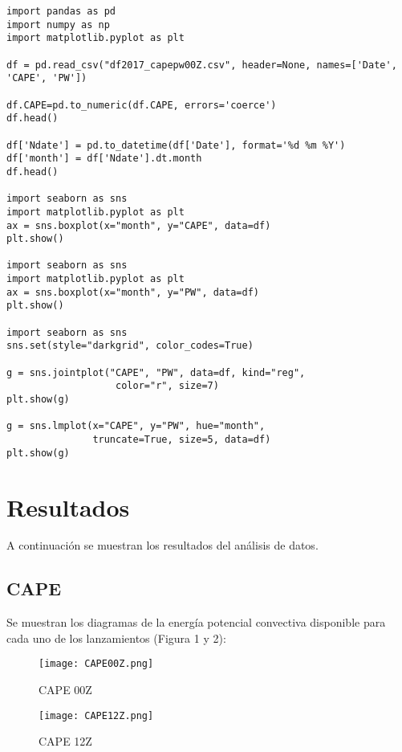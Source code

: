 \documentclass[12pt]{article}
\begin{document}
\begin{verbatim}
import pandas as pd
import numpy as np
import matplotlib.pyplot as plt

df = pd.read_csv("df2017_capepw00Z.csv", header=None, names=['Date', 'CAPE', 'PW'])

df.CAPE=pd.to_numeric(df.CAPE, errors='coerce')
df.head()

df['Ndate'] = pd.to_datetime(df['Date'], format='%d %m %Y')
df['month'] = df['Ndate'].dt.month
df.head()

import seaborn as sns
import matplotlib.pyplot as plt
ax = sns.boxplot(x="month", y="CAPE", data=df)
plt.show()

import seaborn as sns
import matplotlib.pyplot as plt
ax = sns.boxplot(x="month", y="PW", data=df)
plt.show()

import seaborn as sns
sns.set(style="darkgrid", color_codes=True)

g = sns.jointplot("CAPE", "PW", data=df, kind="reg",
                   color="r", size=7)
plt.show(g)

g = sns.lmplot(x="CAPE", y="PW", hue="month",
               truncate=True, size=5, data=df)
plt.show(g)
\end{verbatim}

\pagebreak

\section{Resultados}

A continuación se muestran los resultados del análisis de datos.

\subsection{CAPE}

Se muestran los diagramas de la energía potencial convectiva disponible para cada uno de los lanzamientos (Figura 1 y 2):

\begin{figure}
\begin{centering}
  \texttt{[image: CAPE00Z.png]}
  \caption{CAPE 00Z}
\end{centering}
\end{figure}

\begin{figure}
\begin{centering}
  \texttt{[image: CAPE12Z.png]}
  \caption{CAPE 12Z}
\end{centering}
\end{figure}
\end{document}
